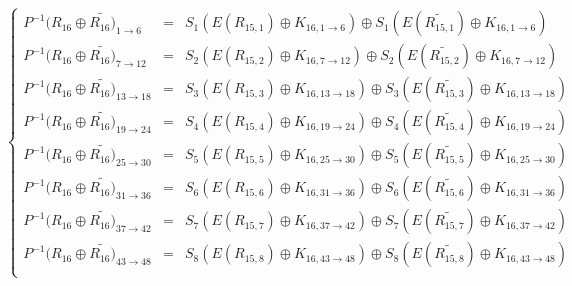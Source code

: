 \documentclass[12pt]{article}
\begin{document}
                    \[\left\{
                      \begin{array}{rcr}
                            P^{-1}(R_{16} \oplus \tilde{R_{16})}_{1\rightarrow6} & = & S_1( E(R_{15, 1}) \oplus K_{16, 1\rightarrow6}) \oplus S_1( E(\tilde{R_{15, 1}}) \oplus K_{16, 1\rightarrow6})\\
                            P^{-1}(R_{16} \oplus \tilde{R_{16})}_{7\rightarrow12} & = & S_2( E(R_{15, 2}) \oplus K_{16, 7\rightarrow12}) \oplus S_2( E(\tilde{R_{15, 2}}) \oplus K_{16, 7\rightarrow12})\\
                            P^{-1}(R_{16} \oplus \tilde{R_{16})}_{13\rightarrow18} & = & S_3( E(R_{15, 3}) \oplus K_{16, 13\rightarrow18}) \oplus S_3( E(\tilde{R_{15, 3}}) \oplus K_{16, 13\rightarrow18})\\
                            P^{-1}(R_{16} \oplus \tilde{R_{16})}_{19\rightarrow24} & = & S_4( E(R_{15, 4}) \oplus K_{16, 19\rightarrow24}) \oplus S_4( E(\tilde{R_{15, 4}}) \oplus K_{16, 19\rightarrow24})\\
                            P^{-1}(R_{16} \oplus \tilde{R_{16})}_{25\rightarrow30} & = & S_5( E(R_{15, 5}) \oplus K_{16, 25\rightarrow30}) \oplus S_5( E(\tilde{R_{15, 5}}) \oplus K_{16, 25\rightarrow30})\\
                            P^{-1}(R_{16} \oplus \tilde{R_{16})}_{31\rightarrow36} & = & S_6( E(R_{15, 6}) \oplus K_{16, 31\rightarrow36}) \oplus S_6( E(\tilde{R_{15, 6}}) \oplus K_{16, 31\rightarrow36})\\
                            P^{-1}(R_{16} \oplus \tilde{R_{16})}_{37\rightarrow42} & = & S_7( E(R_{15, 7}) \oplus K_{16, 37\rightarrow42}) \oplus S_7( E(\tilde{R_{15, 7}}) \oplus K_{16, 37\rightarrow42})\\
                            P^{-1}(R_{16} \oplus \tilde{R_{16})}_{43\rightarrow48} & = & S_8( E(R_{15, 8}) \oplus K_{16, 43\rightarrow48}) \oplus S_8( E(\tilde{R_{15, 8}}) \oplus K_{16, 43\rightarrow48})\\
                      \end{array}
                    \right.\]
                    
\end{document}
